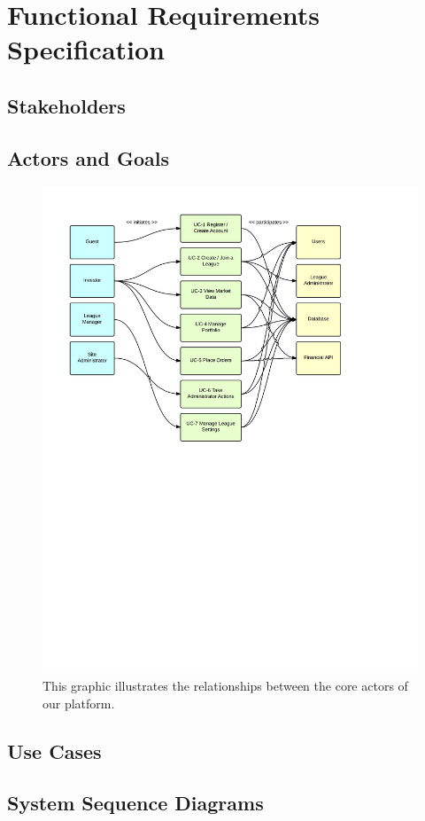 \chapter{Functional Requirements Specification}


\section{Stakeholders}


\section{Actors and Goals}



\begin{figure}[H]
\centering
\includegraphics[width=5.5in]{./img/useCase.jpeg}
\caption{This graphic illustrates the relationships between the core actors of our platform.}
\end{figure}


\section{Use Cases}


\section{System Sequence Diagrams}


